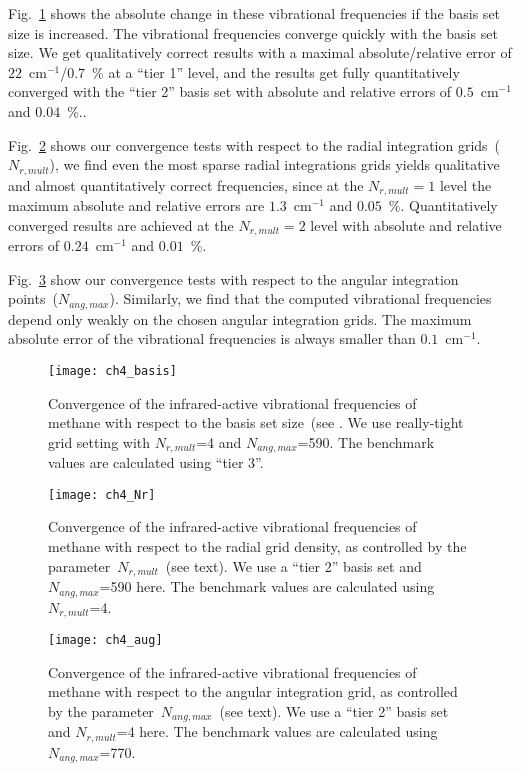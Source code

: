 \documentclass[journal=jpca,manuscript=article]{achemso}
\begin{document}
Fig.~\ref{fig:ch4_basis} shows the absolute change in these
vibrational frequencies if the basis set size is increased. The vibrational frequencies converge quickly with the basis set size. We get qualitatively correct results with a maximal absolute/relative error of $22$~cm$^{-1}$/$0.7$~\% at a ``tier 1'' level, and the results get fully quantitatively converged with the ``tier 2'' basis set with absolute and relative errors of $0.5$~cm$^{-1}$ and $0.04$~\%.. 


Fig.~\ref{fig:ch4_Nr} shows our convergence tests with respect to the radial integration grids~($N_{r,mult}$), we find even the most sparse radial integrations grids yields qualitative and almost quantitatively correct frequencies, since at the $N_{r,mult}=1$ level the maximum absolute and relative errors are $1.3$~cm$^{-1}$ and $0.05$~\%. Quantitatively converged results are achieved at the $N_{r,mult}=2$ level with absolute and relative errors of $0.24$~cm$^{-1}$ and $0.01$~\%.


Fig.~\ref{fig:ch4_aug} show our convergence tests with respect to the angular integration points~($N_{ang,max}$). Similarly, we find that the computed vibrational frequencies depend only weakly on the chosen angular integration grids. The maximum absolute error of the vibrational frequencies is always smaller than $0.1$~cm$^{-1}$.

\begin{figure}
 \centering
 \texttt{[image: ch4\_basis]}
 \caption{Convergence of the infrared-active vibrational frequencies of methane with respect to the basis set size~(see . We use really-tight grid setting with $N_{r,mult}$=4 and $N_{ang,max}$=590. The benchmark values are calculated using ``tier 3''.}
  \label{fig:ch4_basis}
\end{figure}


\begin{figure}
\centering
 \texttt{[image: ch4\_Nr]}
 \caption{
 Convergence of the infrared-active vibrational frequencies of methane with respect to the radial grid density,
 as controlled by the parameter~$N_{r,mult}$~(see text). 
 We use a ``tier 2'' basis set and  $N_{ang,max}$=590 here. The benchmark values are calculated using $N_{r,mult}$=4.}
 \label{fig:ch4_Nr}
\end{figure}

\begin{figure}
 \texttt{[image: ch4\_aug]}
 \caption{
 Convergence of the infrared-active vibrational frequencies of methane with respect to the angular integration grid,
 as controlled by the parameter~$N_{ang,max}$~(see text).
 We use a ``tier 2'' basis set and $N_{r,mult}$=4 here. The benchmark values are calculated using $N_{ang,max}$=770.}
 \label{fig:ch4_aug}
\end{figure}
\end{document}
